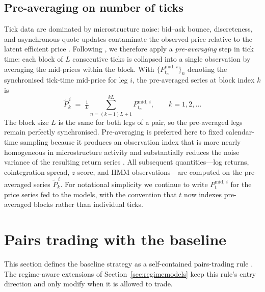 \subsection{Pre-averaging on number of ticks}\label{sec:preaveraging}

Tick data are dominated by microstructure noise: bid--ask bounce, discreteness, and asynchronous quote updates contaminate the observed price relative to the latent efficient price \parencite{roll1984spread,hasbrouck2007microstructure,hautsch2012econometrics}. Following \textcite{jacod2017}, we therefore apply a \emph{pre-averaging} step in tick time: each block of $L$ consecutive ticks is collapsed into a single observation by averaging the mid-prices within the block. With $\{P_{t_n}^{\mathrm{mid},\,i}\}_{n}$ denoting the synchronised tick-time mid-price for leg $i$, the pre-averaged series at block index $k$ is
\begin{equation}\label{eq:preaverage}
    \widetilde P_k^{\,i} \;=\; \tfrac{1}{L}\!\sum_{n=(k-1)L+1}^{kL} P_{t_n}^{\mathrm{mid},\,i},
    \qquad k = 1, 2, \ldots
\end{equation}
The block size $L$ is the same for both legs of a pair, so the pre-averaged legs remain perfectly synchronised. Pre-averaging is preferred here to fixed calendar-time sampling because it produces an observation index that is more nearly homogeneous in microstructure activity and substantially reduces the noise variance of the resulting return series \parencite{jacod2017,aitsahalia2014,andersen2000great}. All subsequent quantities---log returns, cointegration spread, $z$-score, and HMM observations---are computed on the pre-averaged series $\widetilde P_k^{\,i}$. For notational simplicity we continue to write $P_t^{\mathrm{mid},\,i}$ for the price series fed to the models, with the convention that $t$ now indexes pre-averaged blocks rather than individual ticks.


\section{Pairs trading with the baseline}\label{sec:pairsbaseline}

This section defines the baseline strategy as a self-contained pairs-trading rule \parencite{gatev2006pairs,vidyamurthy2004pairs}. The regime-aware extensions of Section~\ref{sec:regimemodels} keep this rule's entry direction and only modify when it is allowed to trade.

